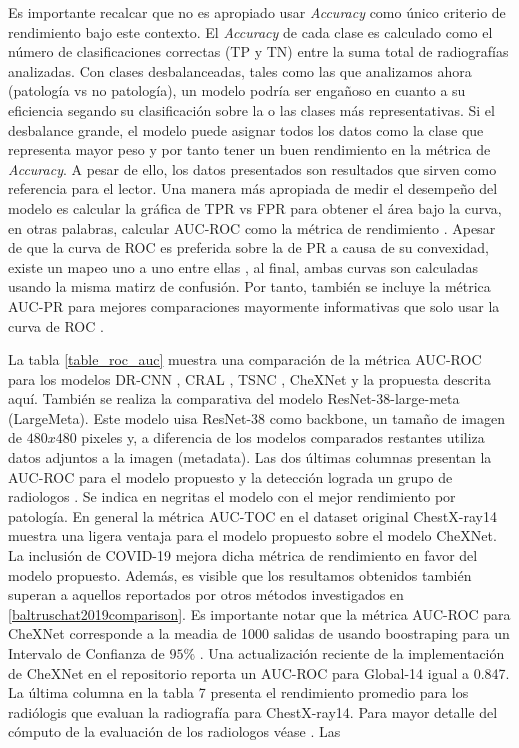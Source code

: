 {Es importante recalcar que no es apropiado usar \textit{Accuracy} como único criterio de rendimiento
bajo este contexto. El \textit{Accuracy} de cada clase es calculado como el número de clasificaciones
correctas (TP y TN) entre la suma total de radiografías analizadas. Con clases desbalanceadas,
tales como las que analizamos ahora (patología vs no patología), un modelo podría ser engañoso en cuanto
a su eficiencia segando su clasificación sobre la o las clases más representativas. Si el desbalance
grande, el modelo puede asignar todos los datos como la clase que representa mayor peso y por tanto
tener un buen rendimiento en la métrica de \textit{Accuracy}. A pesar de ello, los datos presentados
son resultados que sirven como referencia para el lector. Una manera más apropiada de medir el desempeño
del modelo es calcular la gráfica de TPR vs FPR para obtener el área bajo la curva, en otras palabras,
calcular AUC-ROC como la métrica de rendimiento \cite{Hanley1983-tu}. Apesar de que la curva de ROC
es preferida sobre la de PR a causa de su convexidad, existe un mapeo uno a uno entre ellas
\cite{10.1145/1143844.1143874}, al final, ambas curvas son calculadas usando la misma matirz de confusión. Por tanto, también se
incluye la métrica AUC-PR para mejores comparaciones mayormente informativas que solo usar la
curva de ROC \cite{Saito2015-db}.

La tabla \ref{table_roc_auc} muestra una comparación de la métrica AUC-ROC para los modelos DR-CNN
\cite{DBLP:journals/corr/abs-1808-05744}, CRAL \cite{GUAN2020259}, TSNC \cite{CHEN2020221}, CheXNet
\cite{rajpurkar2018deep} y la propuesta descrita aquí. También se realiza la comparativa del modelo
ResNet-38-large-meta (LargeMeta). Este modelo uisa ResNet-38 como backbone, un tamaño de imagen de
$480 x 480$ pixeles y, a diferencia de los modelos comparados restantes utiliza datos adjuntos a la
imagen (metadata). Las dos últimas columnas presentan la AUC-ROC para el modelo propuesto y la
detección lograda un grupo de radiologos \cite{rajpurkar2018deep}. Se indica en negritas el modelo con el mejor
rendimiento por patología. En general la métrica AUC-TOC en el dataset original ChestX-ray14 muestra
una ligera ventaja para el modelo propuesto sobre el modelo CheXNet. La inclusión de COVID-19
mejora dicha métrica de rendimiento en favor del modelo propuesto. Además, es visible que
los resultamos obtenidos también superan a aquellos reportados por otros métodos investigados en
\ref{baltruschat2019comparison}. Es importante notar que la métrica AUC-ROC para CheXNet corresponde
a la meadia de 1000 salidas de usando boostraping para un Intervalo de Confianza de $95\%$
\cite{rajpurkar2018deep}. Una actualización reciente de la implementación de CheXNet en el repositorio
\cite{} reporta un AUC-ROC para Global-14 igual a 0.847. La última columna en la tabla 7 presenta
el rendimiento promedio para los radiólogis que evaluan la radiografía para ChestX-ray14. Para
mayor detalle del cómputo de la evaluación de los radiologos véase \cite{rajpurkar2018deep}. Las }
